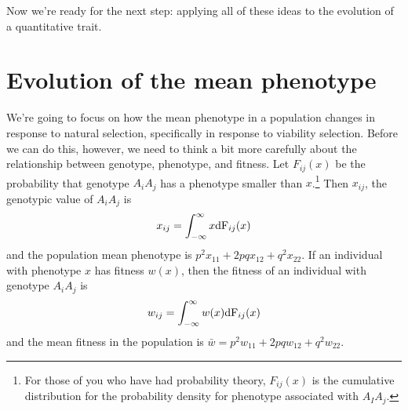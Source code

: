 \documentclass[12pt]{article}
\begin{document}
Now we're ready for the next step: applying all of these ideas to the
evolution of a quantitative trait.

\section*{Evolution of the mean phenotype}

We're going to focus on how the mean phenotype in a population changes
in response to natural selection, specifically in response to
viability selection.  Before we can do this, however, we need to think
a bit more carefully about the relationship between genotype,
phenotype, and fitness.  Let $F_{ij}(x)$ be the probability that
genotype $A_iA_j$ has a phenotype smaller than $x$.\footnote{For those
of you who have had probability theory, $F_{ij}(x)$ is the cumulative
distribution for the probability density for phenotype associated with
$A_IA_j$.} Then $x_{ij}$, the genotypic value of $A_iA_j$
is
\[
x_{ij} = \int_{-\infty}^\infty x \mbox{\rm dF}_{ij}(x)
\]
and the population mean phenotype is $p^2x_{11} + 2pqx_{12} +
q^2x_{22}$.  If an individual with phenotype $x$ has fitness $w(x)$,
then the fitness of an individual with genotype $A_iA_j$
is
\[
w_{ij} = \int_{-\infty}^\infty w(x) \mbox{\rm dF}_{ij}(x)
\]
and the mean fitness in the population is $\bar w = p^2w_{11} +
2pqw_{12} + q^2w_{22}$.
\end{document}
